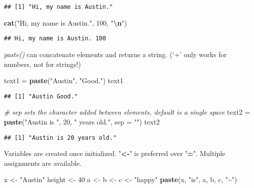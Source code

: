 \documentclass[
  12pt,
]{article}
\newenvironment{Shaded}{\begin{snugshade}}{\end{snugshade}}
\newcommand{\AttributeTok}[1]{\textcolor[rgb]{0.13,0.29,0.53}{#1}}
\newcommand{\CommentTok}[1]{\textcolor[rgb]{0.56,0.35,0.01}{\textit{#1}}}
\newcommand{\DecValTok}[1]{\textcolor[rgb]{0.00,0.00,0.81}{#1}}
\newcommand{\FunctionTok}[1]{\textcolor[rgb]{0.13,0.29,0.53}{\textbf{#1}}}
\newcommand{\NormalTok}[1]{#1}
\newcommand{\OtherTok}[1]{\textcolor[rgb]{0.56,0.35,0.01}{#1}}
\newcommand{\SpecialCharTok}[1]{\textcolor[rgb]{0.81,0.36,0.00}{\textbf{#1}}}
\newcommand{\StringTok}[1]{\textcolor[rgb]{0.31,0.60,0.02}{#1}}
\begin{document}
\begin{verbatim}
## [1] "Hi, my name is Austin."
\end{verbatim}

\begin{Shaded}
\begin{Highlighting}[]
\FunctionTok{cat}\NormalTok{(}\StringTok{"Hi, my name is Austin."}\NormalTok{, }\DecValTok{100}\NormalTok{, }\StringTok{"}\SpecialCharTok{\textbackslash{}n}\StringTok{"}\NormalTok{)}
\end{Highlighting}
\end{Shaded}

\begin{verbatim}
## Hi, my name is Austin. 100
\end{verbatim}

\textit{paste()} can concatenate elements and returns a string. (`+'
only works for numbers, not for strings!)

\begin{Shaded}
\begin{Highlighting}[]
\NormalTok{text1 }\OtherTok{=} \FunctionTok{paste}\NormalTok{(}\StringTok{"Austin"}\NormalTok{, }\StringTok{"Good."}\NormalTok{)}
\NormalTok{text1}
\end{Highlighting}
\end{Shaded}

\begin{verbatim}
## [1] "Austin Good."
\end{verbatim}

\begin{Shaded}
\begin{Highlighting}[]
\CommentTok{\# \textquotesingle{}sep\textquotesingle{} sets the character added between elements, default is a single space}
\NormalTok{text2 }\OtherTok{=} \FunctionTok{paste}\NormalTok{(}\StringTok{"Austin is "}\NormalTok{, }\DecValTok{20}\NormalTok{, }\StringTok{" years old."}\NormalTok{, }\AttributeTok{sep =} \StringTok{""}\NormalTok{)}
\NormalTok{text2}
\end{Highlighting}
\end{Shaded}

\begin{verbatim}
## [1] "Austin is 20 years old."
\end{verbatim}

Variables are created once initialized. \textbf{'<-'} is preferred over
\textbf{'='}. Multiple assignments are available.

\begin{Shaded}
\begin{Highlighting}[]
\NormalTok{x }\OtherTok{\textless{}{-}} \StringTok{"Austin"}
\NormalTok{height }\OtherTok{\textless{}{-}} \DecValTok{40}
\NormalTok{a }\OtherTok{\textless{}{-}}\NormalTok{ b }\OtherTok{\textless{}{-}}\NormalTok{ c }\OtherTok{\textless{}{-}} \StringTok{"happy"}
\FunctionTok{paste}\NormalTok{(x, }\StringTok{"is"}\NormalTok{, a, b, c, }\StringTok{"\textasciitilde{}"}\NormalTok{)}
\end{Highlighting}
\end{Shaded}
\end{document}
